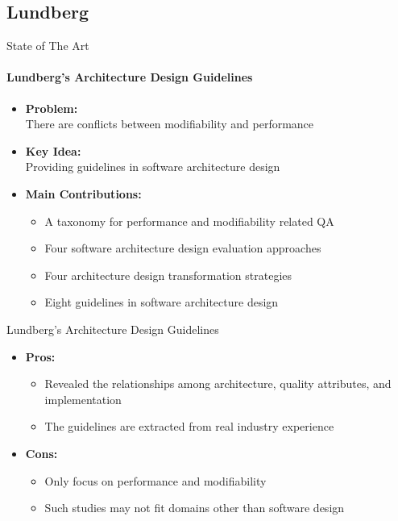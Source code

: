 \documentclass[xcolor=x11names,compress]{beamer}
\renewcommand{\(}{\begin{columns}}
\renewcommand{\)}{\end{columns}}
\newcommand{\<}[1]{\begin{column}{#1}}
\renewcommand{\>}{\end{column}}
\begin{document}
\subsection{Lundberg}
\begin{frame}{State of The Art}
\framesubtitle{Lundberg's Architecture Design Guidelines \cite{Lundberg:qualityattributes}}
\begin{itemize}
\item \textbf{Problem:}\\There are conflicts between modifiability and performance
\item \textbf{Key Idea:} \\Providing guidelines in software architecture design
\item \textbf{Main Contributions:}
\begin{itemize}
	\item A taxonomy for performance and modifiability related QA
	\item Four software architecture design evaluation approaches
	\item Four architecture design transformation strategies
	\item Eight guidelines in software architecture design

\end{itemize}
\end{itemize}

\end{frame}


\begin{frame}{Lundberg's Architecture Design Guidelines}
\begin{itemize}
\item \textbf{Pros:} \\
	\begin{itemize}
	\item Revealed the relationships among architecture, quality attributes, and implementation
	\item The guidelines are extracted from real industry experience
    \end{itemize}
\item \textbf{Cons:} \\
    \begin{itemize}
	\item Only focus on performance and modifiability
	\item Such studies may not fit domains other than software design
    \end{itemize}
\end{itemize}
\end{frame}
\end{document}
